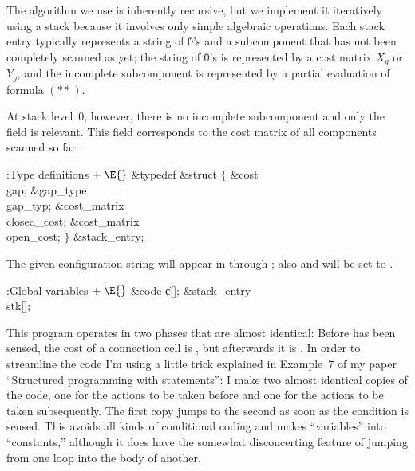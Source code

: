 The algorithm we use is inherently recursive, but we
implement it
iteratively using a stack because it involves only simple algebraic
operations. Each stack entry typically represents a string of \.0's
and a subcomponent that has not been completely scanned as yet;
the string of \.0's is represented by a cost matrix $X_g$ or $Y_g$,
and the incomplete subcomponent is represented by a partial evaluation
of formula $(**)$.

At stack level~0, however, there is no incomplete subcomponent and
only the  field is relevant. This field corresponds to
the cost matrix of all components scanned so far.

\Y\B\4:Type definitions\X${}\mathrel+\E{}$\6
\&{typedef} \&{struct} ${}\{{}$\1\6
\&{cost} \\{gap};\6
\&{gap\_type} \\{gap\_typ};\6
\&{cost\_matrix} \\{closed\_cost};\6
\&{cost\_matrix} \\{open\_cost};\2\6
${}\}{}$ \&{stack\_entry};\par
\fi

The given configuration string will appear in  through ;
also  and  will be set to .

\Y\B\4:Global variables\X${}\mathrel+\E{}$\6
\&{code} \|c[];\6
\&{stack\_entry} \\{stk}[];\par
\fi

This program operates in two phases that are almost
identical:
Before  has been sensed, the cost of a connection cell is
, but afterwards it is . In order to
streamline
the code I'm using a little trick explained in Example~7 of my paper
``Structured programming with  statements'': I make two almost
identical copies of the code, one for the actions to be taken before
 and one for the actions to be taken subsequently.
The first copy jumps to the second as soon as the condition  is
sensed. This avoids all kinds of conditional coding and makes ``variables''
into ``constants,'' although it does have the somewhat disconcerting feature
of jumping from one loop into the body of another.

